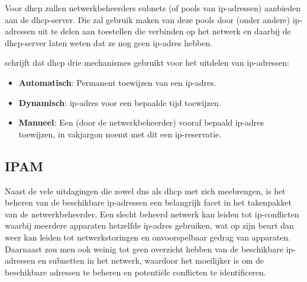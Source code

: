 Voor \acrshort{dhcp} zullen netwerkbeheerders subnets (of pools van \acrshort{ip}-adressen) aanbieden aan de \acrshort{dhcp}-server. Die zal gebruik maken van deze pools door (onder andere) \acrshort{ip}-adressen uit te delen aan toestellen die verbinden op het netwerk en daarbij de \acrshort{dhcp}-server laten weten dat ze nog geen \acrshort{ip}-adres hebben.

\textcite{Droms1997} schrijft dat \acrshort{dhcp} drie mechanismes gebruikt voor het uitdelen van \acrshort{ip}-adressen:
\begin{itemize}
    \item \textbf{Automatisch}: Permanent toewijzen van een \acrshort{ip}-adres.
    \item \textbf{Dynamisch}: \acrshort{ip}-adres voor een bepaalde tijd toewijzen.
    \item \textbf{Manueel}: Een (door de netwerkbeheerder) vooraf bepaald \acrshort{ip}-adres toewijzen, in vakjargon noemt met dit een \acrshort{ip}-reservatie.
\end{itemize}

\subsection{IPAM}
Naast de vele uitdagingen die zowel \acrshort{dns} als \acrshort{dhcp} met zich meebrengen, is het beheren van de beschikbare \acrshort{ip}-adressen een belangrijk facet in het takenpakket van de netwerkbeheerder. Een slecht beheerd netwerk kan leiden tot \acrshort{ip}-conflicten waarbij meerdere apparaten hetzelfde \acrshort{ip}-adres gebruiken, wat op zijn beurt dan weer kan leiden tot netwerkstoringen en onvoorspelbaar gedrag van apparaten. Daarnaast zou men ook weinig tot geen overzicht hebben van de beschikbare \acrshort{ip}-adressen en subnetten in het netwerk, waardoor het moeilijker is om de beschikbare adressen te beheren en potentiële conflicten te identificeren.

